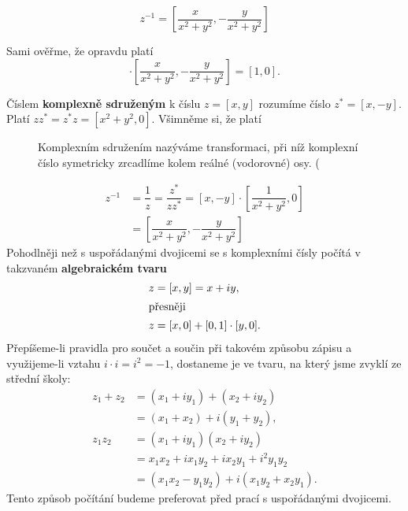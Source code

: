       \begin{mdframed}[style=highlight]
        \begin{equation}\label{mai:eq73}
          z^{-1} = \left[\dfrac{x}{x^2 + y^2}, -\dfrac{y}{x^2 + y^2} \right]
        \end{equation}
      \end{mdframed}
      Sami ověřme, že opravdu platí
      \begin{equation*}
        [x,y]\cdot\left[\dfrac{x}{x^2 + y^2}, -\dfrac{y}{x^2 + y^2} \right] = [1,0].
      \end{equation*}
      
      Číslem \textbf{komplexně sdruženým} k číslu \(z = [x, y]\) rozumíme číslo \(z^* = [x, -y]\). 
      Platí \(zz^* = z^*z = [x^2 + y^2, 0]\). Všimněme si, že platí
      \begin{figure}[ht!]  %
        \centering
        \caption{Komplexním sdružením nazýváme transformaci, při níž komplexní číslo
          symetricky zrcadlíme kolem reálné (vodorovné) osy. (\cite[s.~6]{Kulhanek2018}}
        \label{mai:fig059}
      \end{figure}

      \begin{align*}
        z^{-1} &= \dfrac{1}{z} =\dfrac{z^*}{zz^*}=[x, -y]\cdot\left[\dfrac{1}{x^2+y^2}, 0\right] \\
               &= \left[\dfrac{x}{x^2 + y^2}, -\dfrac{y}{x^2 + y^2} \right]
      \end{align*}
      Pohodlněji než s uspořádanými dvojicemi se s komplexními čísly počítá v takzvaném 
      \textbf{algebraickém tvaru}
      \begin{align*}
        z&= [x ,y] = x + iy,            \\
        \shortintertext{přesněji}
        z &= [x, 0] + [0, 1] \cdot [y, 0].
      \end{align*}
      Přepíšeme-li pravidla pro součet a součin při takovém způsobu zápisu a využijeme-li vztahu 
      \(i \cdot i=i^2 = - 1\), dostaneme je ve tvaru, na který jsme zvyklí ze střední školy:
      \begin{align*}
        z_1 + z_2 &= (x_1 + iy_1) + (x_2 + iy_2)             \\
                  &= (x_1 + x_2) + i(y_1 + y_2),             \\
        z_1z_2    &= (x_1 + iy_1)(x_2 + iy_2)                \\
                  &= x_1x_2 + ix_1y_2 + ix_2y_1 + i^2y_1y_2  \\ 
                  &= (x_1x_2 - y_1y_2) + i(x_1y_2 + x_2y_1).
      \end{align*}
      Tento způsob počítání budeme preferovat před prací s uspořádanými dvojicemi. 
      
